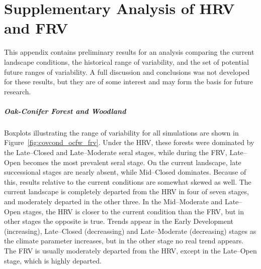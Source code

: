 
\chapter{Supplementary Analysis of HRV and FRV}
\label{app:futurecovcond}

This appendix contains preliminary results for an analysis comparing the current landscape conditions, the historical range of variability, and the set of potential future ranges of variability. A full discussion and conclusions was not developed for these results, but they are of some interest and may form the basis for future research.

\paragraph*{Oak-Conifer Forest and Woodland} 
Boxplots illustrating the range of variability for all simulations are shown in Figure~\ref{fig:covcond_ocfw_frv}. Under the HRV, these forests were dominated by the Late--Closed and Late--Moderate seral stages, while during the FRV, Late--Open becomes the most prevalent seral stage. On the current landscape, late successional stages are nearly absent, while Mid--Closed dominates. Because of this, results relative to the current conditions are somewhat skewed as well. The current landscape is completely departed from the HRV in four of seven stages, and moderately departed in the other three. In the Mid--Moderate and Late--Open stages, the HRV is closer to the current condition than the FRV, but in other stages the opposite is true. Trends appear in the Early Development (increasing), Late--Closed (decreassing) and Late--Moderate (decreasing) stages as the climate parameter increases, but in the other stage no real trend appears. The FRV is usually moderately departed from the HRV, except in the Late--Open stage, which is highly departed.


